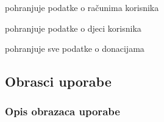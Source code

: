 \begin{packed_enum}
\begin{packed_enum}
				\end{packed_enum}

				\eject

				\item  {}
				
				\begin{packed_enum}
					
					\item pohranjuje podatke o računima korisnika
					\item pohranjuje podatke o djeci korisnika
					\item pohranjuje sve podatke o donacijama
					
				\end{packed_enum}
			\end{packed_enum}
			
			\eject 
			
			
				
			\subsection{Obrasci uporabe}
				
				
				\subsubsection{Opis obrazaca uporabe}			

